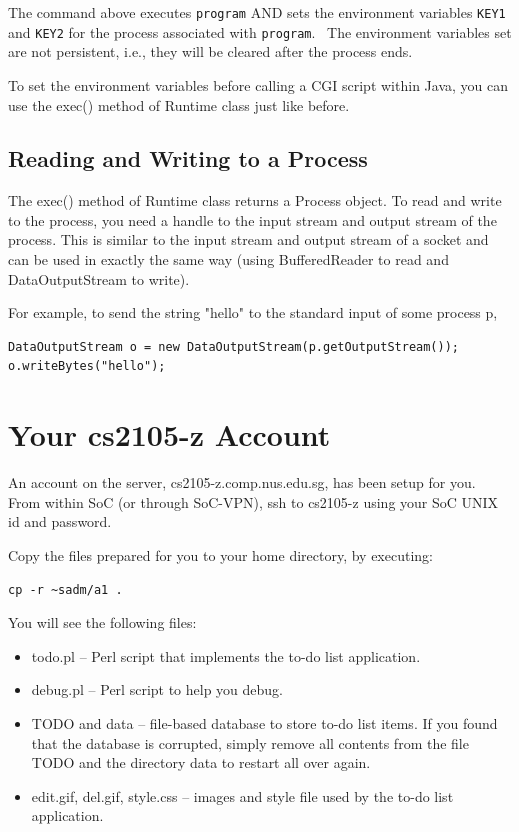 \documentclass[a4paper,11pt]{exam}
\begin{document}
The command above executes \texttt{program} AND sets the environment variables \texttt{KEY1} and \texttt{KEY2} for the process associated with \texttt{program}.  The environment variables set are not persistent, i.e., they will be cleared after the process ends.

To set the environment variables before calling a CGI script within Java, you can use the exec() method of Runtime class just like before.

\subsection*{Reading and Writing to a Process}

The exec() method of Runtime class returns a Process object. To read and write to the process, you need a handle to the input stream and output stream of the process. This is similar to the input stream and output stream of a socket and can be used in exactly the same way (using BufferedReader to read and DataOutputStream to write).

For example, to send the string "hello" to the standard input of some process p,

\begin{verbatim}
DataOutputStream o = new DataOutputStream(p.getOutputStream());
o.writeBytes("hello");
\end{verbatim}

\section*{Your cs2105-z Account}

An account on the server, cs2105-z.comp.nus.edu.sg, has been setup for you. From within SoC (or through SoC-VPN), ssh to cs2105-z using your SoC UNIX id and password.

Copy the files prepared for you to your home directory, by executing:

\begin{verbatim}
cp -r ~sadm/a1 .
\end{verbatim}

You will see the following files:

\begin{itemize}
	\item todo.pl -- Perl script that implements the to-do list application.
	\item debug.pl -- Perl script to help you debug.
	\item TODO and data -- file-based database to store to-do list items. If you found that the database is corrupted, simply remove all contents from the file TODO and the directory data to restart all over again.
	\item edit.gif, del.gif, style.css -- images and style file used by the to-do list application.
\end{itemize}
\end{document}
